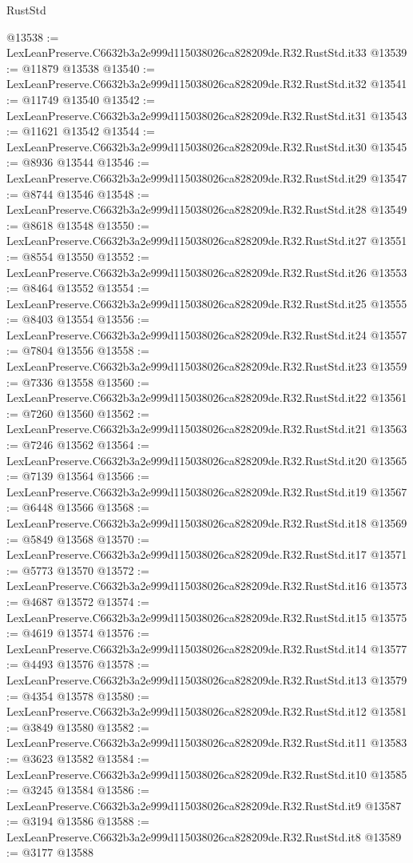 \begin{lexlean}{RustStd}
\begin{coremodule}
@13538 := LexLeanPreserve.C6632b3a2e999d115038026ca828209de.R32.RustStd.it33
@13539 := @11879 @13538
@13540 := LexLeanPreserve.C6632b3a2e999d115038026ca828209de.R32.RustStd.it32
@13541 := @11749 @13540
@13542 := LexLeanPreserve.C6632b3a2e999d115038026ca828209de.R32.RustStd.it31
@13543 := @11621 @13542
@13544 := LexLeanPreserve.C6632b3a2e999d115038026ca828209de.R32.RustStd.it30
@13545 := @8936 @13544
@13546 := LexLeanPreserve.C6632b3a2e999d115038026ca828209de.R32.RustStd.it29
@13547 := @8744 @13546
@13548 := LexLeanPreserve.C6632b3a2e999d115038026ca828209de.R32.RustStd.it28
@13549 := @8618 @13548
@13550 := LexLeanPreserve.C6632b3a2e999d115038026ca828209de.R32.RustStd.it27
@13551 := @8554 @13550
@13552 := LexLeanPreserve.C6632b3a2e999d115038026ca828209de.R32.RustStd.it26
@13553 := @8464 @13552
@13554 := LexLeanPreserve.C6632b3a2e999d115038026ca828209de.R32.RustStd.it25
@13555 := @8403 @13554
@13556 := LexLeanPreserve.C6632b3a2e999d115038026ca828209de.R32.RustStd.it24
@13557 := @7804 @13556
@13558 := LexLeanPreserve.C6632b3a2e999d115038026ca828209de.R32.RustStd.it23
@13559 := @7336 @13558
@13560 := LexLeanPreserve.C6632b3a2e999d115038026ca828209de.R32.RustStd.it22
@13561 := @7260 @13560
@13562 := LexLeanPreserve.C6632b3a2e999d115038026ca828209de.R32.RustStd.it21
@13563 := @7246 @13562
@13564 := LexLeanPreserve.C6632b3a2e999d115038026ca828209de.R32.RustStd.it20
@13565 := @7139 @13564
@13566 := LexLeanPreserve.C6632b3a2e999d115038026ca828209de.R32.RustStd.it19
@13567 := @6448 @13566
@13568 := LexLeanPreserve.C6632b3a2e999d115038026ca828209de.R32.RustStd.it18
@13569 := @5849 @13568
@13570 := LexLeanPreserve.C6632b3a2e999d115038026ca828209de.R32.RustStd.it17
@13571 := @5773 @13570
@13572 := LexLeanPreserve.C6632b3a2e999d115038026ca828209de.R32.RustStd.it16
@13573 := @4687 @13572
@13574 := LexLeanPreserve.C6632b3a2e999d115038026ca828209de.R32.RustStd.it15
@13575 := @4619 @13574
@13576 := LexLeanPreserve.C6632b3a2e999d115038026ca828209de.R32.RustStd.it14
@13577 := @4493 @13576
@13578 := LexLeanPreserve.C6632b3a2e999d115038026ca828209de.R32.RustStd.it13
@13579 := @4354 @13578
@13580 := LexLeanPreserve.C6632b3a2e999d115038026ca828209de.R32.RustStd.it12
@13581 := @3849 @13580
@13582 := LexLeanPreserve.C6632b3a2e999d115038026ca828209de.R32.RustStd.it11
@13583 := @3623 @13582
@13584 := LexLeanPreserve.C6632b3a2e999d115038026ca828209de.R32.RustStd.it10
@13585 := @3245 @13584
@13586 := LexLeanPreserve.C6632b3a2e999d115038026ca828209de.R32.RustStd.it9
@13587 := @3194 @13586
@13588 := LexLeanPreserve.C6632b3a2e999d115038026ca828209de.R32.RustStd.it8
@13589 := @3177 @13588

\end{coremodule}
\end{lexlean}
